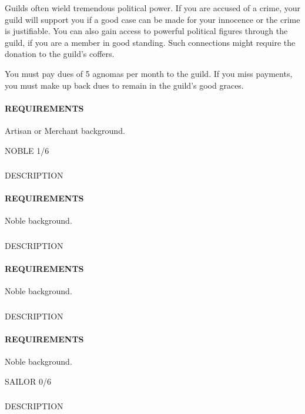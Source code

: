     Guilds often wield tremendous political power.
    If you are accused of a crime, your guild will support you if a good case can be made for your innocence or the crime is justifiable.
    You can also gain access to powerful political figures through the guild, if you are a member in good standing.
    Such connections might require the donation to the guild's coffers.

    You must pay dues of 5 agnomas per month to the guild.
    If you miss payments, you must make up back dues to remain in the guild's good graces.
    \paragraph{REQUIREMENTS} Artisan or Merchant background.

NOBLE 1/6
    \subsubsection{} \label{feat::NAME}
    DESCRIPTION
    \paragraph{REQUIREMENTS} Noble background.

    \subsubsection{} \label{feat::NAME}
    DESCRIPTION
    \paragraph{REQUIREMENTS} Noble background.

    \subsubsection{} \label{feat::NAME}
    DESCRIPTION
    \paragraph{REQUIREMENTS} Noble background.

SAILOR 0/6
    \subsubsection{} \label{feat::NAME}
    DESCRIPTION
